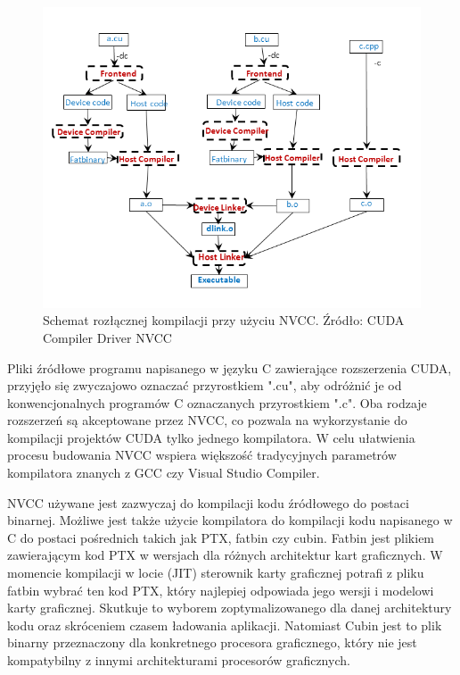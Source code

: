 \begin{figure}[H]
\centering
\includegraphics[scale=0.8]{images/nvcc-options-for-separate-compilation.png}
\caption{Schemat rozłącznej kompilacji przy użyciu NVCC. Źródło: CUDA Compiler Driver NVCC}
\label{compilation}
\end{figure}

Pliki źródłowe programu napisanego w języku C zawierające rozszerzenia CUDA, przyjęło się zwyczajowo
oznaczać przyrostkiem ".cu", aby odróżnić je od konwencjonalnych programów C
oznaczanych przyrostkiem ".c". Oba rodzaje rozszerzeń są akceptowane przez NVCC, co
pozwala na wykorzystanie do kompilacji projektów CUDA tylko jednego kompilatora.
W celu ułatwienia procesu budowania NVCC wspiera większość tradycyjnych
parametrów kompilatora znanych z GCC czy Visual Studio Compiler. 

NVCC używane jest zazwyczaj do kompilacji kodu źródłowego do postaci binarnej.
Możliwe jest także użycie kompilatora do kompilacji kodu napisanego w C do
postaci pośrednich takich jak PTX, fatbin czy cubin. Fatbin jest plikiem
zawierającym kod PTX w wersjach dla różnych architektur kart graficznych.  W
momencie kompilacji w locie (JIT) sterownik karty graficznej potrafi z pliku
fatbin wybrać ten kod PTX, który najlepiej odpowiada jego wersji i modelowi
karty graficznej. Skutkuje to wyborem zoptymalizowanego dla danej architektury
kodu oraz skróceniem czasem ładowania aplikacji. Natomiast Cubin jest to plik
binarny przeznaczony dla konkretnego procesora graficznego, który nie jest
kompatybilny z innymi architekturami procesorów graficznych.

